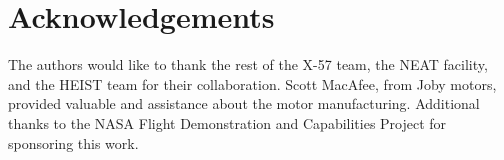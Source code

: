 \documentclass[]{aiaa-tc}%
\begin{document}
\section{Acknowledgements}

The authors would like to thank the rest of the X-57 team, the NEAT facility, and the HEIST team for their collaboration. Scott MacAfee, from Joby motors, provided valuable and assistance about the motor manufacturing. Additional thanks to the NASA Flight Demonstration and Capabilities Project for sponsoring this work.




\end{document}
